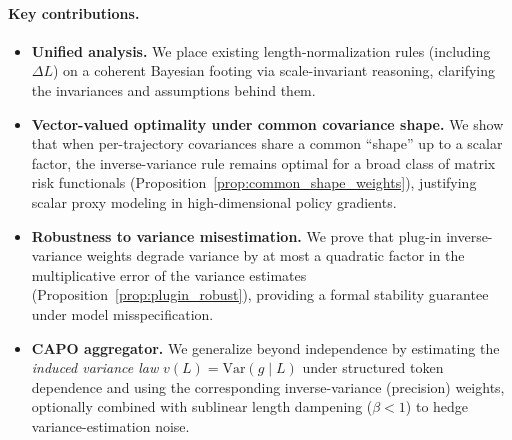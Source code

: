 \paragraph{Key contributions.}
\begin{itemize}
  \item \textbf{Unified analysis.} We place existing length-normalization rules (including $\Delta L$) on a coherent Bayesian footing via scale-invariant reasoning, clarifying the invariances and assumptions behind them.

  \item \textbf{Vector-valued optimality under common covariance shape.} We show that when per-trajectory covariances share a common ``shape'' up to a scalar factor, the inverse-variance rule remains optimal for a broad class of matrix risk functionals (Proposition~\ref{prop:common_shape_weights}), justifying scalar proxy modeling in high-dimensional policy gradients.
  \item \textbf{Robustness to variance misestimation.} We prove that plug-in inverse-variance weights degrade variance by at most a quadratic factor in the multiplicative error of the variance estimates (Proposition~\ref{prop:plugin_robust}), providing a formal stability guarantee under model misspecification.
  \item \textbf{CAPO aggregator.} We generalize beyond independence by estimating the \emph{induced variance law} $v(L)=\mathrm{Var}(g\mid L)$ under structured token dependence and using the corresponding inverse-variance (precision) weights, optionally combined with sublinear length dampening (\(\beta<1\)) to hedge variance-estimation noise.


\end{itemize}
